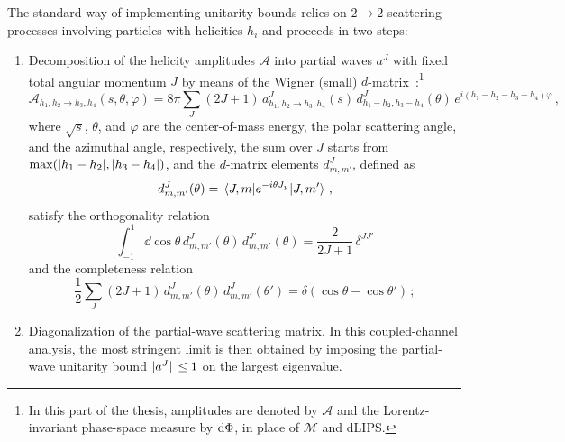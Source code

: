 


The standard way of implementing unitarity bounds relies on $2\to 2$ scattering processes involving particles with helicities $h_i$ and proceeds in two steps:
\begin{enumerate}
    \item Decomposition of the helicity amplitudes $\mathcal A$ into partial waves $a^J$ with fixed total angular momentum $J$ by means of the Wigner (small) $d$-matrix~\cite{Jacob:1959at,Varshalovich:1988ifq}:\footnote{In this part of the thesis, amplitudes are denoted by $\mathcal A$ and the Lorentz-invariant phase-space measure by $\text d\Phi$, in place of $\mathcal M$ and $\text{dLIPS}$.}
    \begin{equation}
        \mathcal A_{h_1,h_2\to h_3,h_4}(s,\theta,\varphi) = 8\pi \sum_{J} (2J+1)\,a^J_{h_1,h_2\to h_3,h_4}(s)\,d^J_{h_1-h_2,h_3-h_4}(\theta)\,e^{i(h_1-h_2-h_3+h_4)\varphi}\,,
    \end{equation}
    where $\sqrt{s}$, $\theta$, and $\varphi$ are the center-of-mass energy, the polar scattering angle, and the azimuthal angle, respectively, the sum over $J$ starts from $\max(\abs{h_1-h_2},\abs{h_3-h_4})$, and the $d$-matrix elements $d^J_{m,m'}$, defined as
    \begin{equation}
        d_{m,m'}^J(\theta) = \mel{J,m}{e^{-i\theta J_y}}{J,m'}\,,
    \end{equation}
    satisfy the orthogonality relation
    \begin{equation}
        \int_{-1}^1 \dd \cos\theta \, d^J_{m,m'}(\theta)\,d^{J'}_{m,m'}(\theta) = \frac{2}{2J+1}\,\delta^{JJ'}
    \end{equation}
    and the completeness relation
    \begin{equation}
        \frac{1}{2}\sum_{J} (2J+1)\,d^J_{m,m'}(\theta)\,d^J_{m,m'}(\theta')=\delta(\cos\theta-\cos\theta')\,;
    \end{equation}

    \item Diagonalization of the partial-wave scattering matrix. In this coupled-channel analysis, the most stringent limit is then obtained by imposing the partial-wave unitarity bound $\abs*{a^J}\le 1$ on the largest eigenvalue.
\end{enumerate}

